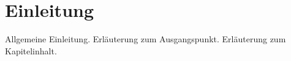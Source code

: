\chapter{Einleitung}
%
%
Allgemeine Einleitung.
%
%
Erläuterung zum Ausgangspunkt.
%
%
Erläuterung zum Kapitelinhalt.